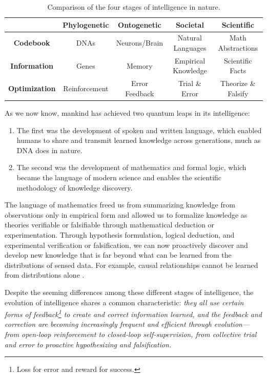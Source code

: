 \documentclass[../../book-main.tex]{subfiles}
\begin{document}
\begin{table}[h]
    \centering
    \resizebox{1\columnwidth}{!}
    {
        \begin{tabular}{| c | c | c | c | c |}
            \hline & \textbf{Phylogenetic} & \textbf{Ontogenetic} &
            \textbf{Societal} & \textbf{Scientific}\\
            \hline

            \textbf{Codebook}  & DNAs & Neurons/Brain & Natural
            Languages & Math Abstractions \\ [0.5ex]
            \hline

            \textbf{Information} & Genes & Memory & Empirical
            Knowledge & Scientific Facts\\ [0.5ex]
            \hline
            \textbf{Optimization} & Reinforcement & Error Feedback &
            Trial \& Error & Theorize \& Falsify \\  [0.5ex]
            \hline
        \end{tabular}
    }
    \caption{Comparison of the four stages of intelligence in nature.}
    \label{tab:four-stage-intelligence}
\end{table}

As we now know, mankind has achieved two quantum leaps in its intelligence:
\begin{enumerate}
    \item The first was the development of spoken and written
        language, which enabled humans to share and transmit learned
        knowledge across generations, much as DNA does in nature.
    \item The second was the development of mathematics and formal
        logic, which became the language of modern science and enables
        the scientific methodology of knowledge discovery.
\end{enumerate}
The language of mathematics freed us from summarizing knowledge from
observations only in empirical form and allowed us to formalize
knowledge as theories verifiable or falsifiable through mathematical 
deduction or experimentation. Through hypothesis formulation, logical
deduction, and experimental verification or falsification, we can now
proactively discover and develop new knowledge that is far beyond
what can be learned from the distributions of sensed
data. For example, causal relationships cannot be learned
from distributions alone \citep{Pearl-2009}. 

Despite the seeming differences among these different stages of
intelligence, the evolution of intelligence shares a common
characteristic: \textit{they all use certain forms of
    feedback\footnote{Loss for error and reward for success.} to create
    and correct information learned, and the feedback and correction are
    becoming increasingly frequent and efficient through evolution---from 
    open-loop reinforcement to closed-loop self-supervision, from
collective trial and error to proactive hypothesizing and falsification.}
\end{document}
